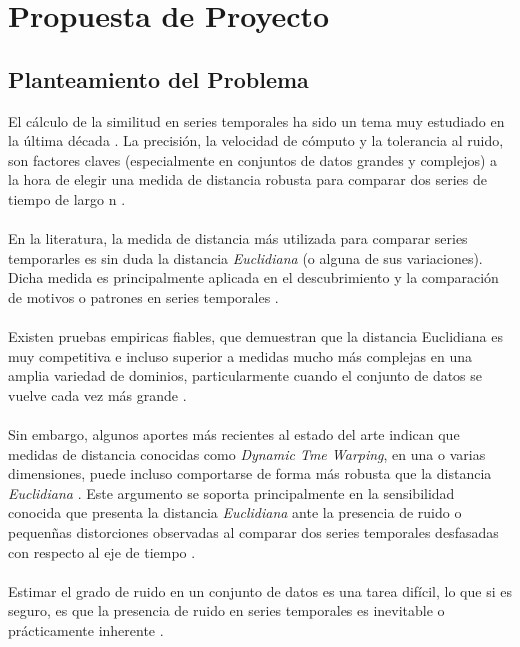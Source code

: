 \section{\textbf{Propuesta de Proyecto}}
\subsection{Planteamiento del Problema}
El c\'alculo de la similitud en series temporales ha sido un tema muy estudiado en la \'ultima d\'ecada \cite{rulediscovery}. La precisi\'on, la velocidad de c\'omputo y la tolerancia al ruido, son factores claves (especialmente en conjuntos de datos grandes y complejos) a la hora de elegir una medida de distancia robusta para comparar dos series de tiempo de largo n \cite{multidimensional}.\\\\
En la literatura, la medida de distancia m\'as utilizada para comparar series temporarles es sin duda la distancia \textit{Euclidiana} (o alguna de sus variaciones). Dicha medida es principalmente aplicada en el descubrimiento y la comparaci\'on de motivos o patrones en series temporales \cite{motifs}\cite{patterns}.\\\\
Existen pruebas empiricas fiables, que demuestran que la distancia Euclidiana es muy competitiva e incluso superior a medidas mucho m\'as complejas en una amplia variedad de dominios, particularmente cuando el conjunto de datos se vuelve cada vez m\'as grande \cite{distancecomparison}\cite{timewarpingindexing}.\\\\
Sin embargo, algunos aportes m\'as recientes al estado del arte indican que medidas de distancia conocidas como \textit{Dynamic Tme Warping}, en una o varias dimensiones, puede incluso comportarse de forma m\'as robusta que la distancia \textit{Euclidiana} \cite{keogh}. Este argumento se soporta principalmente en la sensibilidad conocida que presenta la distancia \textit{Euclidiana} ante la presencia de ruido o pequen\~nas distorciones observadas al comparar dos series temporales desfasadas con respecto al eje de tiempo \cite{DTWcubicsplineinterpolation}.\\\\
Estimar el grado de ruido en un conjunto de datos es una tarea dif\'icil, lo que si es seguro, es que la presencia de ruido en series temporales es inevitable o pr\'acticamente inherente \cite{noise}.\\\\
